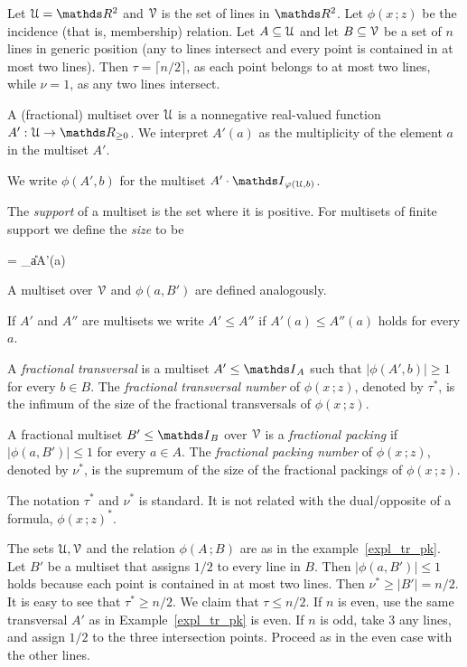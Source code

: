 \documentclass[scombinatorics.tex]{subfiles}
\begin{document}
\begin{example}\label{expl_tr_pk}
  Let $\U=\RR^2$ and $\EuScript V$ is the set of lines in $\RR^2$.
  Let $\phi(x\,;z)$ be the incidence (that is, membership) relation.
  Let $A\subseteq\EuScript U$ and let $B\subseteq\EuScript V$ be a set of $n$ lines in generic position
  (any to lines intersect and every point is contained in at most two lines).
  Then $\tau=\lceil n/2\rceil$, as each point belongs to at most two lines, while $\nu=1$, as any two lines intersect.\QED
\end{example}  


A (fractional) multiset over $\EuScript U$ is a nonnegative real-valued function $A':\U\to\RR_{\ge0}$.
We interpret $A'(a)$ as the multiplicity of the element $a$ in the multiset $A'$.

We write \emph{$\phi(A',b)$\/} for the multiset $A'\cdot\Indicator_{\phi(\U,b)}$.

The \emph{support\/} of a multiset is the set where it is positive.
For multisets of finite support we define the \emph{size\/} to be\smallskip 

{=}
{\sum_{a\in\U}A'(a)}

A multiset over $\EuScript V$ and $\phi(a,B')$ are defined analogously.
 
If $A'$ and $A''$ are multisets we write $A'\le A''$ if $A'(a)\le A''(a)$ holds for every $a$.

A \emph{fractional transversal\/} is a multiset $A'\le\Indicator_A$ such that $|\phi(A', b)|\ge1$ for every $b\in B$.
The \emph{fractional transversal number\/} of $\phi(x\,;z)$, denoted by $\tau^*$, is the  infimum of the size of the fractional transversals of $\phi(x\,;z)$.

A fractional multiset $B'\le\Indicator_B$ over $\EuScript V$ is a \emph{fractional packing\/} if $|\phi(a,B')|\le1$ for every $a\in A$.
The \emph{fractional packing number\/} of $\phi(x\,;z)$, denoted by $\nu^*$, is the supremum of the size of the fractional packings of $\phi(x\,;z)$.

The notation $\tau^*$ and $\nu^*$ is standard. 
It is not related with the dual/opposite of a formula, $\phi(x\,;z)^*$. 

\begin{example}
  The sets $\EuScript U,\EuScript V$ and the relation $\phi(A\,;B)$ are as in the example~\ref{expl_tr_pk}.
  Let $B'$ be a multiset that assigns $1/2$ to every line in $B$. Then $|\phi(a,B')|\le1$ holds because each point is contained in at most two lines.
  Then $\nu^*\ge |B'|=n/2$.
  It is easy to see that $\tau^*\ge n/2$.
  We claim that $\tau\le n/2$.
  If $n$ is even, use the same transversal $A'$ as in Example~\ref{expl_tr_pk} is even.
  If $n$ is odd, take $3$ any lines, and assign $1/2$ to the three intersection points.
  Proceed as in the even case with the other lines.\QED
\end{example}
\end{document}
